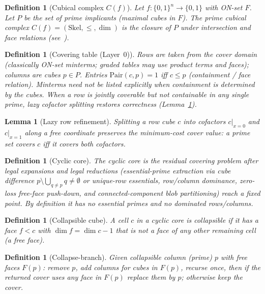 \documentclass[11pt]{article}
\newtheorem{lemma}[theorem]{Lemma}
\newtheorem{definition}[theorem]{Definition}
\begin{document}
\begin{definition}[Cubical complex $C(f)$]
Let $f:\{0,1\}^n\to\{0,1\}$ with ON-set $F$.  Let $P$ be the set of prime
implicants (maximal cubes in $F$).  The \emph{prime cubical complex}
$C(f)=(\mathrm{Skel},\le,\dim)$ is the closure of $P$ under intersection and
face relations (see~\cite{coppola2007}).
\end{definition}

\begin{definition}[Covering table (Layer~0)]
\label{def:covering-table}
Rows are taken from the cover domain (classically ON-set minterms; graded tables
may use product terms and faces); columns are cubes $p\in P$.  Entries
$\mathrm{Pair}(c,p)=1$ iff $c\le p$ (containment / face relation).  Minterms need
not be listed explicitly when containment is determined by the cubes.  When a row
is jointly coverable but not containable in any single prime, lazy cofactor
splitting restores correctness (Lemma~\ref{lem:refine}).
\end{definition}

\begin{lemma}[Lazy row refinement]
\label{lem:refine}
Splitting a row cube $c$ into cofactors $c|_{x=0}$ and $c|_{x=1}$ along a
free coordinate preserves the minimum-cost cover value: a prime set covers
$c$ iff it covers both cofactors.
\end{lemma}

\begin{definition}[Cyclic core]
\label{def:cyclic-core}
The \emph{cyclic core} is the residual covering problem after legal expansions
and legal reductions (essential-prime extraction via cube difference
$p\setminus\bigcup_{q\ne p}q\ne\emptyset$ or unique-row essentials, row/column
dominance, zero-loss free-face push-down, and connected-component
\emph{blob} partitioning) reach a fixed point.  By definition it has no essential
primes and no dominated rows/columns.
\end{definition}

\begin{definition}[Collapsible cube]
A cell $c$ in a cyclic core is \emph{collapsible} if it has a face $f<c$ with
$\dim f=\dim c-1$ that is not a face of any other remaining cell
(a \emph{free face}).
\end{definition}

\begin{definition}[Collapse-branch]
Given collapsible column (prime) $p$ with free faces $F(p)$: remove $p$, add
columns for cubes in $F(p)$, recurse once, then if the returned cover uses any
face in $F(p)$ replace them by $p$; otherwise keep the cover.
\end{definition}
\end{document}
